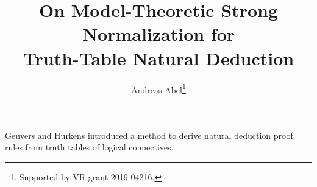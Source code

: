 \documentclass[a4paper]{easychair}
\begin{document}
\title{On Model-Theoretic Strong Normalization for \\ Truth-Table Natural Deduction}
\author{Andreas Abel\thanks{Supported by VR grant 2019-04216.}}


\maketitle


\noindent


\newcommand{\wraptt}{%
\begin{wrapfigure}[7]{r}[0pt]{0pt}%
\(\begin{array}{cc|c}
  A & B & A \to B \\
\hline
  0 & 0 & 1 \\
  0 & 1 & 1 \\
  1 & 0 & 0 \\
  1 & 1 & 1 \\
\end{array}\)%
\end{wrapfigure}%
}

Geuvers and Hurkens \citeyearpar{geuversHurkens:icla17} introduced a method to derive natural
deduction proof rules from truth tables of logical connectives.
\end{document}
